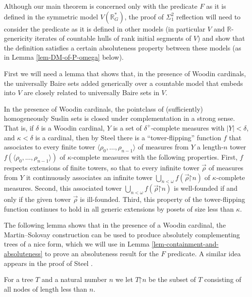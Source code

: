 \documentclass[fleqn, 11pt]{amsart}
\theoremstyle{plain}
\theoremstyle{definition}
\theoremstyle{remark}
\newcommand{\restrict}{\mathord{\restriction}}
\begin{document}
Although our main theorem is concerned only with the predicate $F$ as it is defined in the symmetric model $V(\mathbb{R}^*_G)$, the proof of $\Sigma^2_1$ reflection will need to consider the predicate as it is defined in other models (in particular $V$ and $\mathbb{R}$-genericity iterates of countable hulls of rank initial segments of $V$) and show that the definition satisfies a certain absoluteness property between these models (as in Lemma \ref{lem-DM-of-P-omega} below).


First we will need a lemma that shows that, in the presence of Woodin cardinals, the universally Baire sets added generically over a countable model that embeds into $V$ are closely related to universally Baire sets in $V$. 




In the presence of Woodin cardinals, the pointclass of (sufficiently) homogeneously Suslin sets is closed under complementation in a strong sense. That is, if $\delta$ is a Woodin cardinal, $Y$ is a set of $\delta^+$-complete measures with $|Y| < \delta$, and $\kappa < \delta$ is a cardinal, then by Steel \cite[Lemma~2.1]{SteSTFree} there is a ``tower-flipping'' function $f$ that associates to every finite tower $\langle\rho_0,\ldots,\rho_{n-1}\rangle$ of measures from $Y$ a length-$n$ tower $f(\langle\rho_0,\ldots,\rho_{n-1}\rangle)$ of $\kappa$-complete measures with the following properties. First, $f$ respects extensions of finite towers, so that to every infinite tower $\vec{\rho}$ of measures from $Y$ it continuously associates an infinite tower $\bigcup_{n<\omega} f(\vec{\rho} \restrict n)$ of $\kappa$-complete measures. Second, this associated tower $\bigcup_{n<\omega} f(\vec{\rho} \restrict n)$ is well-founded if and only if the given tower $\vec{\rho}$ is ill-founded.  Third, this property of the tower-flipping function continues to 
hold in all generic extensions by posets of size less than $\kappa$.


The following lemma shows that in the presence of a Woodin cardinal, the Martin--Solovay construction can be used to produce absolutely complementing trees of a nice form, which we will use in Lemma \ref{lem-containment-and-absoluteness} to prove an absoluteness result for the $F$ predicate. A similar idea appears in the proof of Steel \cite[Theorem~2.2, Subclaim~1.1]{SteSTFree}.

 For a tree $T$ and a natural number $n$ we let $T \mathord{\restrict} n$ be the subset of $T$ consisting of all nodes of length less than $n$.
\end{document}
